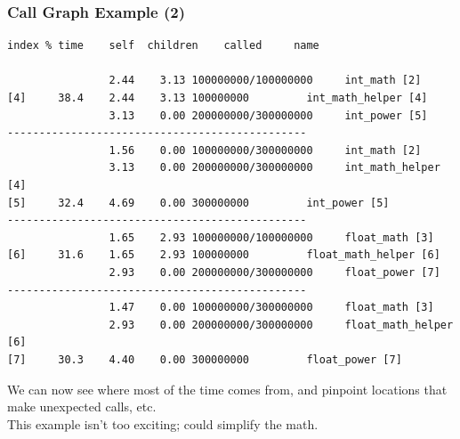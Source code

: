 \begin{frame}[fragile]
  \frametitle{Call Graph Example (2)}


\begin{changemargin}{1.5cm}
  
  \begin{lstlisting}[basicstyle=\tiny]
index % time    self  children    called     name

                2.44    3.13 100000000/100000000     int_math [2]
[4]     38.4    2.44    3.13 100000000         int_math_helper [4]
                3.13    0.00 200000000/300000000     int_power [5]
-----------------------------------------------
                1.56    0.00 100000000/300000000     int_math [2]
                3.13    0.00 200000000/300000000     int_math_helper [4]
[5]     32.4    4.69    0.00 300000000         int_power [5]
-----------------------------------------------
                1.65    2.93 100000000/100000000     float_math [3]
[6]     31.6    1.65    2.93 100000000         float_math_helper [6]
                2.93    0.00 200000000/300000000     float_power [7]
-----------------------------------------------
                1.47    0.00 100000000/300000000     float_math [3]
                2.93    0.00 200000000/300000000     float_math_helper [6]
[7]     30.3    4.40    0.00 300000000         float_power [7]
  \end{lstlisting}

  
 We can now see where most of the time comes from, and pinpoint 
      locations that make unexpected calls, etc.\\[1em]
 This example isn't too exciting; could simplify the math.
 \end{changemargin}
\end{frame}

